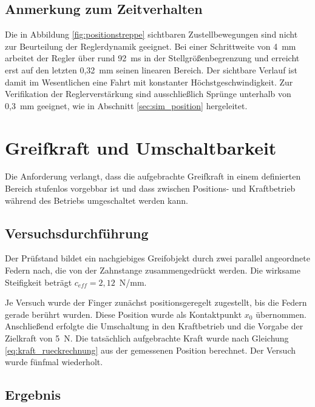 \subsection*{Anmerkung zum Zeitverhalten}

Die in Abbildung \ref{fig:positionstreppe} sichtbaren Zustellbewegungen sind nicht zur
Beurteilung der Reglerdynamik geeignet. Bei einer Schrittweite von 4~mm arbeitet der
Regler über rund 92~ms in der Stellgrößenbegrenzung und erreicht erst auf den letzten
0,32~mm seinen linearen Bereich. Der sichtbare Verlauf ist damit im Wesentlichen eine
Fahrt mit konstanter Höchstgeschwindigkeit. Zur Verifikation der Reglerverstärkung sind
ausschließlich Sprünge unterhalb von 0,3~mm geeignet, wie in Abschnitt
\ref{sec:sim_position} hergeleitet.

\section{Greifkraft und Umschaltbarkeit}
\label{sec:ergebnis_kraft}

Die Anforderung verlangt, dass die aufgebrachte Greifkraft in einem definierten Bereich
stufenlos vorgebbar ist und dass zwischen Positions- und Kraftbetrieb während des Betriebs
umgeschaltet werden kann.

\subsection*{Versuchsdurchführung}

Der Prüfstand bildet ein nachgiebiges Greifobjekt durch zwei parallel angeordnete Federn
nach, die von der Zahnstange zusammengedrückt werden. Die wirksame Steifigkeit beträgt
$c_{eff} = 2{,}12$~N/mm.

Je Versuch wurde der Finger zunächst positionsgeregelt zugestellt, bis die Federn gerade
berührt wurden. Diese Position wurde als Kontaktpunkt $x_0$ übernommen. Anschließend
erfolgte die Umschaltung in den Kraftbetrieb und die Vorgabe der Zielkraft von 5~N. Die
tatsächlich aufgebrachte Kraft wurde nach Gleichung \ref{eq:kraft_rueckrechnung} aus der
gemessenen Position berechnet. Der Versuch wurde fünfmal wiederholt.

\subsection*{Ergebnis}

